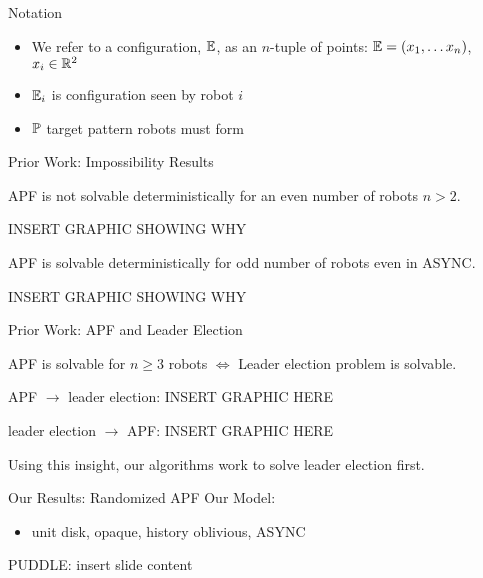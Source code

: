 \documentclass{beamer}
\begin{document}
\begin{frame}{Notation}
	\begin{itemize}
		\item We refer to a configuration, $\mathbb{E}$, as an $n$-tuple of points: $\mathbb{E} = (x_1,\ldots x_n)$, $x_i \in \mathbb{R}^2$
		\item $\mathbb{E}_i$ is configuration seen by robot $i$
		\item $\mathbb{P}$ target pattern robots must form
	\end{itemize}
\end{frame}

\begin{frame}{Prior Work: Impossibility Results}
	\begin{theorem} 
		APF is not solvable deterministically for an even number of robots $ n > 2$.
	\end{theorem} 
	INSERT GRAPHIC SHOWING WHY
	\begin{theorem} 
		APF is solvable deterministically for odd number of robots even in ASYNC.
	\end{theorem} 
	INSERT GRAPHIC SHOWING WHY
\end{frame}

\begin{frame}{Prior Work: APF and Leader Election}
	\begin{theorem} 
		APF is solvable for $n \geq 3$ robots $\iff$ Leader election problem is solvable.
	\end{theorem} 
	APF $\rightarrow$ leader election:
	\pause
	INSERT GRAPHIC HERE

	leader election $\rightarrow$ APF: 
	\pause
	INSERT GRAPHIC HERE

	Using this insight, our algorithms work to solve leader election first.

\end{frame}

\begin{frame}{Our Results: Randomized APF}
	Our Model:
	\begin{itemize}
		\item unit disk, opaque, history oblivious, ASYNC
	\end{itemize}
\end{frame}

\begin{frame}{PUDDLE: }
	insert slide content
\end{frame}
\end{document}
